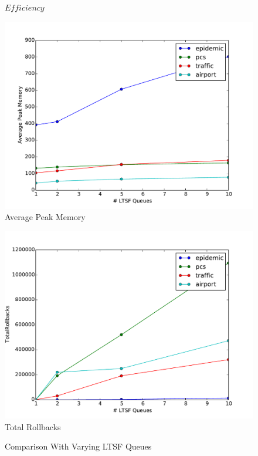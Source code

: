 \documentclass[11pt]{book}
\begin{document}
\begin{figure}
\begin{minipage}{.5\textwidth}
\begin{center}
      $Efficiency$ \\
    \end{center}
  \end{minipage}
  \begin{minipage}{.5\textwidth}
    \begin{center}
      \includegraphics[width=\textwidth,keepaspectratio,quiet]{figs/pending_event_set/ltsf_memory.pdf} \\
      Average Peak Memory \\
    \end{center}
  \end{minipage}%
  \hfill
  \begin{minipage}{.5\textwidth}
    \begin{center}
      \includegraphics[width=\textwidth,keepaspectratio,quiet]{figs/pending_event_set/ltsf_rollbacks.pdf} \\
      Total Rollbacks \\
    \end{center}
  \end{minipage}
  \caption{Comparison With Varying LTSF Queues}\label{ltsf_analysis}
\end{figure}
\end{document}
